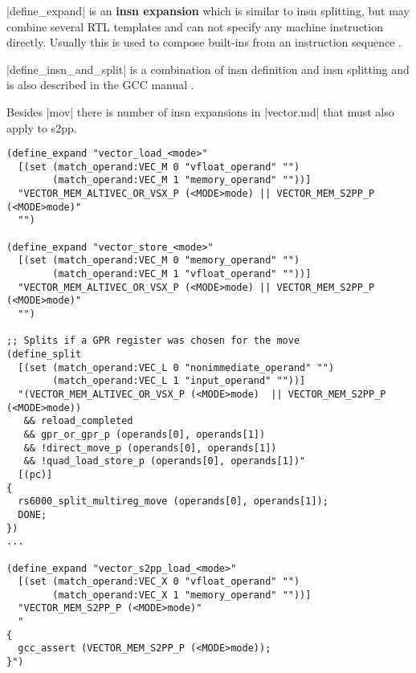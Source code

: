 |define_expand| is an \textbf{insn expansion} which is similar to insn splitting, but may combine several RTL templates and can not specify any machine instruction directly.
Usually this is used to compose built-ins from an instruction sequence \citep{GCCint:defineexpand}.

|define_insn_and_split| is a combination of insn definition and insn splitting and is also described in the GCC manual \citep{GCCint:definesplit}.

Besides |mov| there is number of insn expansions in |vector.md| that must also apply to s2pp.
\begin{lstlisting}
(define_expand "vector_load_<mode>"
  [(set (match_operand:VEC_M 0 "vfloat_operand" "")
        (match_operand:VEC_M 1 "memory_operand" ""))]
  "VECTOR_MEM_ALTIVEC_OR_VSX_P (<MODE>mode) || VECTOR_MEM_S2PP_P (<MODE>mode)"
  "")

(define_expand "vector_store_<mode>"
  [(set (match_operand:VEC_M 0 "memory_operand" "")
        (match_operand:VEC_M 1 "vfloat_operand" ""))]
  "VECTOR_MEM_ALTIVEC_OR_VSX_P (<MODE>mode) || VECTOR_MEM_S2PP_P (<MODE>mode)"
  "")

;; Splits if a GPR register was chosen for the move
(define_split
  [(set (match_operand:VEC_L 0 "nonimmediate_operand" "")
        (match_operand:VEC_L 1 "input_operand" ""))]
  "(VECTOR_MEM_ALTIVEC_OR_VSX_P (<MODE>mode)  || VECTOR_MEM_S2PP_P (<MODE>mode))
   && reload_completed
   && gpr_or_gpr_p (operands[0], operands[1])
   && !direct_move_p (operands[0], operands[1])
   && !quad_load_store_p (operands[0], operands[1])"
  [(pc)]
{
  rs6000_split_multireg_move (operands[0], operands[1]);
  DONE;
})
...

(define_expand "vector_s2pp_load_<mode>"
  [(set (match_operand:VEC_X 0 "vfloat_operand" "")
        (match_operand:VEC_X 1 "memory_operand" ""))]
  "VECTOR_MEM_S2PP_P (<MODE>mode)"
  "
{
  gcc_assert (VECTOR_MEM_S2PP_P (<MODE>mode));
}")


\end{lstlisting}

